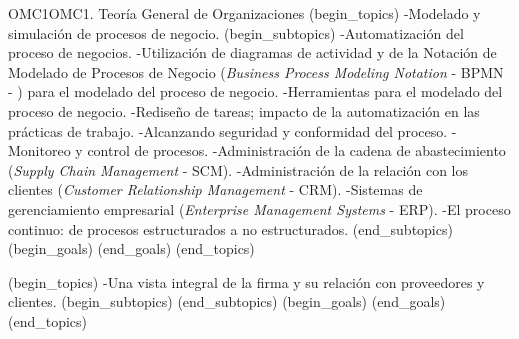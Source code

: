\begin{BKL2}{OMC1}{OMC1. Teoría General de Organizaciones}
(begin_topics)
-Modelado y simulación de procesos de negocio.
(begin_subtopics)
-Automatización del proceso de negocios.
-Utilización de diagramas de actividad y de la Notación de Modelado de Procesos de Negocio (\emph{Business Process Modeling Notation} - BPMN - ) para el modelado del proceso de negocio.
-Herramientas para el modelado del proceso de negocio.
-Rediseño de tareas; impacto de la automatización en las prácticas de trabajo.
-Alcanzando seguridad y conformidad del proceso.
-Monitoreo y control de procesos.
-Administración de la cadena de abastecimiento (\emph{Supply Chain Management} - SCM). 
-Administración de la relación con los clientes (\emph{Customer Relationship Management} - CRM).
-Sistemas de gerenciamiento empresarial (\emph{Enterprise Management Systems} - ERP).
-El proceso continuo: de procesos estructurados a no estructurados.
(end_subtopics)
(begin_goals)
(end_goals)
(end_topics)

(begin_topics)
-Una vista integral de la firma y su relación con proveedores y clientes.
(begin_subtopics)
(end_subtopics)
(begin_goals)
(end_goals)
(end_topics)

\end{BKL2}



